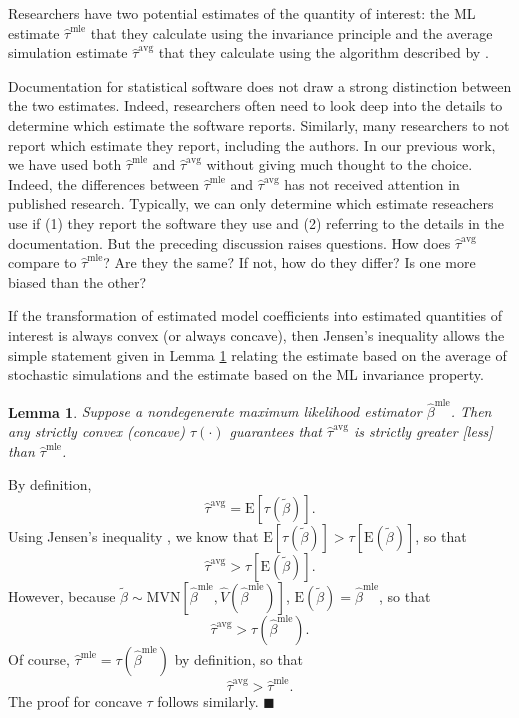 \documentclass[11pt]{article}
\newtheorem{lemma}{Lemma}
\newenvironment{proof}[1][Proof]{\begin{trivlist}
\item[\hskip \labelsep {\bfseries #1}]}{\end{trivlist}}
\begin{document}
Researchers have two potential estimates of the quantity of interest: the ML estimate $\hat{\tau}^\text{mle}$ that they calculate using the invariance principle and the average simulation estimate $\hat{\tau}^\text{avg}$ that they calculate using the algorithm described by \cite{KingTomzWittenberg2000}. 

Documentation for statistical software does not draw a strong distinction between the two estimates.
Indeed, researchers often need to look deep into the details to determine which estimate the software reports.
Similarly, many researchers to not report which estimate they report, including the authors. In our previous work, we have used both $\hat{\tau}^\text{mle}$ and $\hat{\tau}^\text{avg}$ without giving much thought to the choice.
Indeed, the differences between $\hat{\tau}^\text{mle}$ and $\hat{\tau}^\text{avg}$ has not received attention in published research. 
Typically, we can only determine which estimate reseachers use if (1) they report the software they use and (2) referring to the details in the documentation. 
But the preceding discussion raises questions.
How does $\hat{\tau}^\text{avg}$ compare to $\hat{\tau}^{\text{mle}}$? 
Are they the same? 
If not, how do they differ? 
Is one more biased than the other?

If the transformation of estimated model coefficients into estimated quantities of interest is always convex (or always concave), then Jensen's inequality allows the simple statement given in Lemma \ref{lem:direction} relating the estimate based on the average of stochastic simulations and the estimate based on the ML invariance property.

\begin{lemma}\label{lem:direction}
Suppose a nondegenerate maximum likelihood estimator $\hat{\beta}^\text{mle}$.
Then any strictly convex (concave) $\tau(\cdot)$ guarantees that $\hat{\tau}^{\text{avg}}$ is strictly greater [less] than $\hat{\tau}^\text{mle}$.
\end{lemma}
\begin{proof}
By definition, $$ \hat{\tau}^{\text{avg}} = \text{E}\left[ \tau \left(\tilde{\beta} \right) \right].$$
Using Jensen's inequality \citep[p. 190, Thm. 4.7.7]{CasellaBerger2002}, we know that $\text{E}\left[ \tau \left(\tilde{\beta} \right) \right] > \tau \left[ \text{E}\left( \tilde{\beta} \right) \right]$, so that $$\hat{\tau}^{\text{avg}} > \tau \left[ \text{E}\left( \tilde{\beta} \right) \right].$$
However, because $\tilde{\beta} \sim \text{MVN} \left[ \hat{\beta}^{\text{mle}}, \hat{V} \left( \hat{\beta}^{\text{mle}} \right) \right]$, $\text{E}\left( \tilde{\beta} \right) = \hat{\beta}^\text{mle}$, so that
$$\hat{\tau}^{\text{avg}} > \tau \left( \hat{\beta}^\text{mle}\right).$$
Of course, $\hat{\tau}^\text{mle} = \tau \left( {\hat{\beta}^\text{mle}} \right)$ by definition, so that $$\hat{\tau}^{\text{avg}} > \hat{\tau}^\text{mle}.$$
The proof for concave $\tau$ follows similarly.
 $\blacksquare$
\end{proof}
\end{document}
